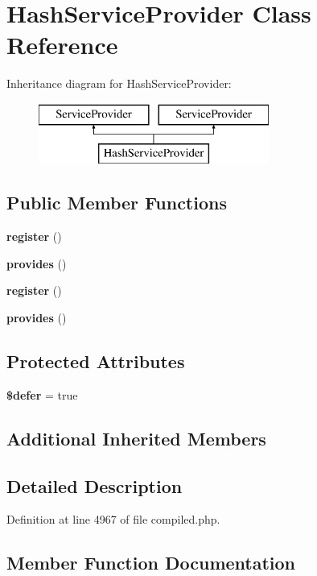 \section{Hash\+Service\+Provider Class Reference}
\label{class_illuminate_1_1_hashing_1_1_hash_service_provider}
Inheritance diagram for Hash\+Service\+Provider\+:\begin{figure}[H]
\begin{center}
\leavevmode
\includegraphics[height=2.000000cm]{class_illuminate_1_1_hashing_1_1_hash_service_provider}
\end{center}
\end{figure}
\subsection*{Public Member Functions}
\begin{DoxyCompactItemize}
\item 
{\bf register} ()
\item 
{\bf provides} ()
\item 
{\bf register} ()
\item 
{\bf provides} ()
\end{DoxyCompactItemize}
\subsection*{Protected Attributes}
\begin{DoxyCompactItemize}
\item 
{\bf \$defer} = true
\end{DoxyCompactItemize}
\subsection*{Additional Inherited Members}


\subsection{Detailed Description}


Definition at line 4967 of file compiled.\+php.



\subsection{Member Function Documentation}
